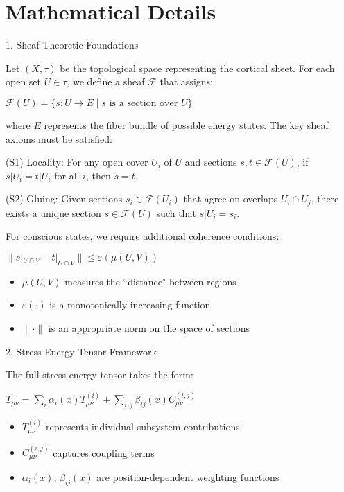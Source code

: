 \section{Mathematical Details}

1. Sheaf-Theoretic Foundations

Let $(X,\tau)$ be the topological space representing the cortical sheet. For each open set $U \in \tau$, we define a sheaf $\mathcal{F}$ that assigns:

$\mathcal{F}(U) = \{s: U \rightarrow E \mid s \text{ is a section over } U\}$

where $E$ represents the fiber bundle of possible energy states. The key sheaf axioms must be satisfied:

(S1) Locality: For any open cover ${U_i}$ of $U$ and sections $s,t \in \mathcal{F}(U)$, if $s|U_i = t|U_i$ for all $i$, then $s = t$.

(S2) Gluing: Given sections $s_i \in \mathcal{F}(U_i)$ that agree on overlaps $U_i \cap U_j$, there exists a unique section $s \in \mathcal{F}(U)$ such that $s|U_i = s_i$.

For conscious states, we require additional coherence conditions:

$\|s|_{U \cap V} - t|_{U \cap V}\| \leq \varepsilon(\mu(U,V))$

\begin{itemize}
\item $\mu(U,V)$ measures the ``distance" between regions
\item $\varepsilon(\cdot)$ is a monotonically increasing function
\item $\|\cdot\|$ is an appropriate norm on the space of sections
\end{itemize}

2. Stress-Energy Tensor Framework

The full stress-energy tensor takes the form:

$T_{\mu\nu} = \sum_i \alpha_i(x)T^{(i)}_{\mu\nu} + \sum_{i,j} \beta_{ij}(x)C^{(i,j)}_{\mu\nu}$

\begin{itemize}
\item $T^{(i)}_{\mu\nu}$ represents individual subsystem contributions
\item $C^{(i,j)}_{\mu\nu}$ captures coupling terms
\item $\alpha_i(x)$, $\beta_{ij}(x)$ are position-dependent weighting functions
\end{itemize}

